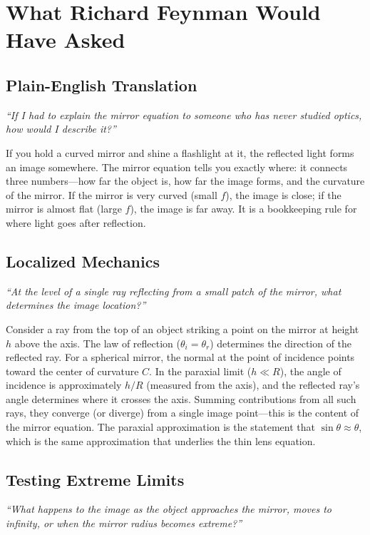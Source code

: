\documentclass[11pt,openright]{book}
\begin{document}
\section*{What Richard Feynman Would Have Asked}

\subsection*{Plain-English Translation}
\textit{``If I had to explain the mirror equation to someone who has never studied optics, how would I describe it?''}

If you hold a curved mirror and shine a flashlight at it, the reflected light forms an image somewhere. The mirror equation tells you exactly where: it connects three numbers---how far the object is, how far the image forms, and the curvature of the mirror. If the mirror is very curved (small $f$), the image is close; if the mirror is almost flat (large $f$), the image is far away. It is a bookkeeping rule for where light goes after reflection.

\subsection*{Localized Mechanics}
\textit{``At the level of a single ray reflecting from a small patch of the mirror, what determines the image location?''}

Consider a ray from the top of an object striking a point on the mirror at height $h$ above the axis. The law of reflection ($\theta_{i} = \theta_{r}$) determines the direction of the reflected ray. For a spherical mirror, the normal at the point of incidence points toward the center of curvature $C$. In the paraxial limit ($h \ll R$), the angle of incidence is approximately $h/R$ (measured from the axis), and the reflected ray's angle determines where it crosses the axis. Summing contributions from all such rays, they converge (or diverge) from a single image point---this is the content of the mirror equation. The paraxial approximation is the statement that $\sin\theta \approx \theta$, which is the same approximation that underlies the thin lens equation.

\subsection*{Testing Extreme Limits}
\textit{``What happens to the image as the object approaches the mirror, moves to infinity, or when the mirror radius becomes extreme?''}
\end{document}
